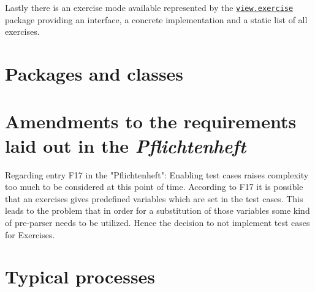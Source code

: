 \documentclass[a4paper, parskip=half]{scrartcl}
\newcommand{\pkglnk}[1]{\hyperref[pkg:edu.kit.wavelength.client.#1]{#1}}
\begin{document}
Lastly there is an exercise mode available represented by the \texttt{\pkglnk{view.exercise}} package providing
an interface, a concrete implementation and a static list of all exercises.

\pagebreak
\section{Packages and classes}


\section{Amendments to the requirements laid out in the \textit{Pflichtenheft}}

Regarding entry F17 in the "Pflichtenheft":
Enabling test cases raises complexity too much to be considered at this point of time.
According to F17 it is possible that an exercises gives predefined variables which
are set in the test cases. This leads to the problem that in order for a substitution of
those variables some kind of pre-parser needs to be utilized.
Hence the decision to not implement test cases for Exercises.

\section{Typical processes}

\end{document}
